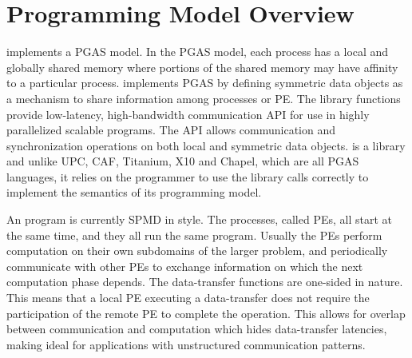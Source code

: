 \section{Programming Model Overview}

\openshmem implements a \ac{PGAS} model. In the \ac{PGAS} model, each process has a local and 
globally shared memory where portions of the shared memory may have affinity to a particular process. 
\openshmem implements \ac{PGAS} by defining symmetric data objects as a mechanism to share information among \openshmem processes or \ac{PE}. 
The \openshmem library functions provide low-latency, high-bandwidth communication \ac{API} for  use  in  highly  parallelized 
scalable programs. The \ac{API} allows communication and synchronization operations on both local and symmetric data objects. 
\openshmem is a library and unlike UPC, CAF, Titanium, X10 and Chapel, which are all
PGAS languages, it relies on the programmer to use the library calls correctly to implement the semantics of its programming model.

An \openshmem program is currently \ac{SPMD} in style. The
\openshmem  processes, called \ac{PE}s, all start at the
same time, and they all run the same program. Usually the \ac{PE}s perform
computation on their own subdomains of the larger problem, and periodically 
communicate with other \ac{PE}s to exchange information on which the
next computation phase depends.
The \openshmem data-transfer functions are one-sided in nature. This means that a local \ac{PE} executing a data-transfer does not require the participation of the remote \ac{PE} to complete the operation. This allows for overlap between communication and computation which hides data-transfer latencies, making \openshmem ideal for applications with unstructured communication patterns.

